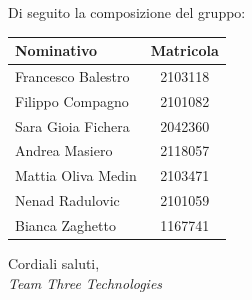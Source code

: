 \documentclass[a4paper,12pt]{article}
\begin{document}
Di seguito la composizione del gruppo: 
\begin{center}
\begin{tabular}{|l|c|}
\hline
\rowcolor{lightgray}
\textbf{Nominativo} & \textbf{Matricola} \\ 
\hline
Francesco Balestro & 2103118 \\ 
Filippo Compagno & 2101082 \\ 
Sara Gioia Fichera & 2042360 \\ 
Andrea Masiero & 2118057\\
Mattia Oliva Medin & 2103471\\
Nenad Radulovic & 2101059\\
Bianca Zaghetto & 1167741\\
\hline

\end{tabular}
\end{center}

\vspace{1cm}
Cordiali saluti,\\[0.3cm]
\textit{Team Three Technologies}
\end{document}
